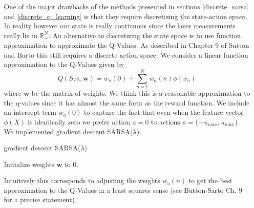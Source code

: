 \documentclass{article}
\begin{document}
One of the major drawbacks of the methods presented in sections \ref{discrete_sarsa} and \ref{discrete_q_learning} is that they require discretizing the state-action space. In reality however our state is really continuous since the laser measurements really lie in $\mathbb{R}_+^N$. An alternative to discretizing the state space is to use function approximation to approximate the Q-Values. As described in Chapter 9 of Sutton and Barto \cite{SuttonBarto} this still requires a discrete action space. We consider a linear function approximation to the Q-Values given by
%
%
%
\begin{equation}
\label{q_value_approx}
Q(S,a, \mathbf{w}) = w_a(0) + \sum_{n = 1}^N w_a(n)\phi(x_n)
\end{equation}
%
%
where $\mathbf{w}$ be the matrix of weights. We think this is a reasonable approximation to the q-values since it has almost the same form as the reward function. We include an intercept term $w_a(0)$ to capture the fact that even when the feature vector $\phi(X)$ is identically zero we prefer action $a = 0$ to actions $a=\{-u_{max},u_{max}\}$. We implemented gradient descent SARSA($\lambda$). 
%
%
\begin{algorithm}[H]
   \caption{gradient descent SARSA($\lambda$)}
   \label{alg:gradDescentSARSA}
\begin{algorithmic}
   \STATE Initialize weights $\mathbf{w}$ to $0$.
   \REPEAT

\end{algorithmic}
\end{algorithm}
%
%
Intuitively this corresponds to adjusting the weights $w_a(n)$ to get the best approximation to the Q-Values in a least squares sense (see Button-Sarto Ch. 9 for a precise statement) . 
\end{document}
